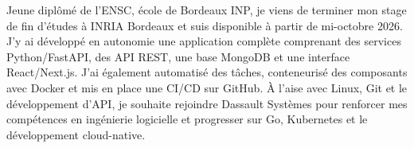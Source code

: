 
\begin{cvparagraph}
Jeune diplômé de l’ENSC, école de Bordeaux INP, je viens de terminer mon stage de fin d’études à INRIA Bordeaux et suis disponible à partir de mi-octobre 2026. J’y ai développé en autonomie une application complète comprenant des services Python/FastAPI, des API REST, une base MongoDB et une interface React/Next.js. J’ai également automatisé des tâches, conteneurisé des composants avec Docker et mis en place une CI/CD sur GitHub. À l’aise avec Linux, Git et le développement d’API, je souhaite rejoindre Dassault Systèmes pour renforcer mes compétences en ingénierie logicielle et progresser sur Go, Kubernetes et le développement cloud-native.
\end{cvparagraph}
